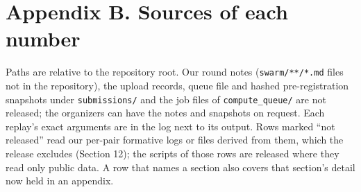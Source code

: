 \documentclass[
]{article}
\begin{document}
\section{Appendix B. Sources of each
number}\label{appendix-b.-sources-of-each-number}

Paths are relative to the repository root. Our round notes
(\texttt{swarm/**/*.md} files not in the repository), the upload
records, queue file and hashed pre-registration snapshots under
\texttt{submissions/} and the job files of \texttt{compute\_queue/} are
not released; the organizers can have the notes and snapshots on
request. Each replay's exact arguments are in the log next to its
output. Rows marked ``not released'' read our per-pair formative logs or
files derived from them, which the release excludes (Section 12); the
scripts of those rows are released where they read only public data. A
row that names a section also covers that section's detail now held in
an appendix.
\end{document}

